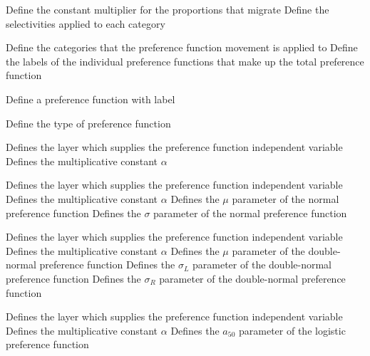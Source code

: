  {Define the constant multiplier for the proportions that migrate}
 {Define the selectivities applied to each category}
\par\textbf{}\par
\par\textbf{}\par
{} {Define the categories that the preference function movement is applied to}
 {Define the labels of the individual  preference functions that make up the total preference function}
\par {} {Define a preference function with label}\par
{} {Define the type of preference function}
\par\textbf{}\par
{} {Defines the layer which supplies the preference function independent variable}
 {Defines the multiplicative constant $\alpha$}
\par\textbf{}\par
{} {Defines the layer which supplies the preference function independent variable}
 {Defines the multiplicative constant $\alpha$}
 {Defines the $\mu$ parameter of the normal preference function}
 {Defines the $\sigma$ parameter of the normal preference function}
\par\textbf{}\par
{} {Defines the layer which supplies the preference function independent variable}
 {Defines the multiplicative constant $\alpha$}
 {Defines the $\mu$ parameter of the double-normal preference function}
 {Defines the $\sigma_L$ parameter of the double-normal preference function}
 {Defines the $\sigma_R$ parameter of the double-normal preference function}
\par\textbf{}\par
{} {Defines the layer which supplies the preference function independent variable}
 {Defines the multiplicative constant $\alpha$}
 {Defines the $a_{50}$ parameter of the logistic preference function}
